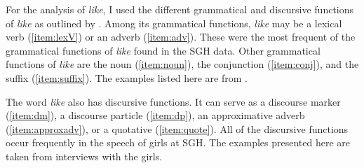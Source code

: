 For the analysis of \textit{like}, I used the different grammatical and discursive functions of \textit{like} as outlined by \citet{darcy2007}. Among its grammatical functions, \textit{like} may be a lexical verb (\ref{item:lexV}) or an adverb (\ref{item:adv}). These were the most frequent of the grammatical functions of \textit{like} found in the SGH data. Other grammatical functions of \textit{like} are the noun (\ref{item:noun}), the conjunction (\ref{item:conj}), and the suffix (\ref{item:suffix}). The examples listed here are from \citet{darcy2007}.



\noindent The word \textit{like} also has discursive functions. It can serve as a discourse marker (\ref{item:dm}), a discourse particle (\ref{item:dp}), an approximative adverb (\ref{item:approxadv}), or a quotative (\ref{item:quote}). All of the discursive functions occur frequently in the speech of girls at SGH. The examples presented here are taken from interviews with the girls.



